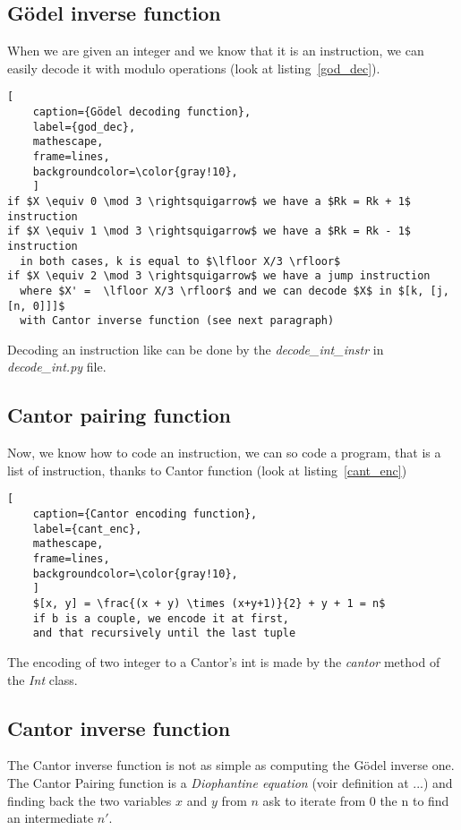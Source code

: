 \subsection{Gödel inverse function}
When we are given an integer and we know that it is an instruction, we can easily decode it with modulo operations (look at listing~\ref{god_dec}).
\begin{lstlisting}[
    caption={Gödel decoding function}, 
    label={god_dec},
    mathescape, 
    frame=lines,
    backgroundcolor=\color{gray!10},
    ]
if $X \equiv 0 \mod 3 \rightsquigarrow$ we have a $Rk = Rk + 1$ instruction
if $X \equiv 1 \mod 3 \rightsquigarrow$ we have a $Rk = Rk - 1$ instruction
  in both cases, k is equal to $\lfloor X/3 \rfloor$
if $X \equiv 2 \mod 3 \rightsquigarrow$ we have a jump instruction
  where $X' =  \lfloor X/3 \rfloor$ and we can decode $X$ in $[k, [j, [n, 0]]]$ 
  with Cantor inverse function (see next paragraph)
\end{lstlisting}
Decoding an instruction like can be done by the \textit{decode\_int\_instr} in \textit{decode\_int.py} file.

\subsection{Cantor pairing function}
\label{sec:cant_pair_func}
Now, we know how to code an instruction, we can so code a program, that is a list of instruction, thanks to Cantor function (look at listing~\ref{cant_enc})

\begin{lstlisting}[
    caption={Cantor encoding function}, 
    label={cant_enc},
    mathescape, 
    frame=lines,
    backgroundcolor=\color{gray!10},
    ]
    $[x, y] = \frac{(x + y) \times (x+y+1)}{2} + y + 1 = n$
    if b is a couple, we encode it at first,
    and that recursively until the last tuple
\end{lstlisting}

The encoding of two integer to a Cantor's int is made by the \textit{cantor} method of the \textit{Int} class.

\subsection{Cantor inverse function}
The Cantor inverse function is not as simple as computing the Gödel inverse one. The Cantor Pairing function is a \textit{Diophantine equation} (voir definition at ...) and finding back the two variables $x$ and $y$ from $n$ ask to iterate from 0 the n to find an intermediate $n'$.  

